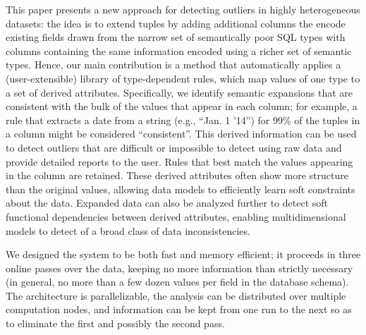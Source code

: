 This paper presents a new approach for detecting outliers in highly heterogeneous datasets: the idea is to extend tuples by adding additional columns the encode existing fields drawn from the narrow set of semantically poor SQL types with columns containing the same information encoded using a richer set of semantic types.
Hence, our main contribution is a method that automatically applies a (user-extensible) library of type-dependent rules, which map values of one type to a set of derived attributes.
Specifically, we identify semantic expansions that are consistent with the bulk of the values that appear in each column;  for example,  a rule that extracts a date from a string (e.g., ``Jan. 1 '14'') for 99\% of the tuples in a column might be considered ``consistent''.
This derived information can be used to detect outliers that are difficult or impossible to detect using raw data and provide detailed reports to the user.
Rules that best match the values appearing in the column are retained.
These derived attributes often show more structure than the original values, allowing data models to efficiently learn soft constraints about the data. 
Expanded data can also be analyzed further to detect soft functional dependencies between derived attributes, enabling multidimensional models to detect of a broad class of data inconsistencies.


We designed the system to be both fast and memory efficient; it proceeds in three online passes over the data, keeping no more information than strictly necessary (in general, no more than a few dozen values per field in the database schema). The architecture is parallelizable, the analysis can be distributed over multiple computation nodes, and information can be kept from one run to the next so as to eliminate the first and possibly the second pass.

